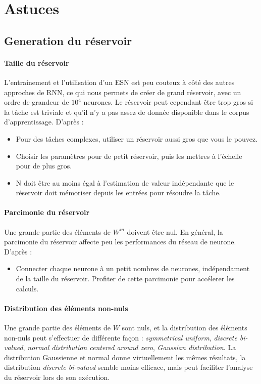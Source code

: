 \documentclass[12pt]{article}
\begin{document}
\section{Astuces}
\subsection{Generation du réservoir}
\paragraph{Taille du réservoir}
L'entrainement et l'utilisation d'un ESN est peu couteux à côté des autres approches de RNN, ce qui nous permets de créer de grand réservoir, avec un ordre de grandeur de $10^{4}$ neurones. Le réservoir peut cependant être trop gros si la tâche est triviale et qu'il n'y a pas assez de donnée disponible dans le corpus d'apprentissage.\newline
D'après \cite{Lukosevicius12}:
\begin{itemize}
\item Pour des tâches complexes, utiliser un réservoir aussi gros que vous le pouvez.
\item Choisir les paramètres pour de petit réservoir, puis les mettres à l'échelle pour de plus gros.
\item N doit être au moins égal à l'estimation de valeur indépendante que le réservoir doit mémoriser depuis les entrées pour résoudre la tâche.
\end{itemize}

\paragraph{Parcimonie du réservoir}
Une grande partie des éléments de $W^{in}$ doivent être nul. En général, la parcimonie du réservoir affecte peu les performances du réseau de neurone.\newline
D'après \cite{Lukosevicius12}:
\begin{itemize}
\item Connecter chaque neurone à un petit nombres de neurones, indépendament de la taille du réservoir. Profiter de cette parcimonie pour accélerer les calculs.
\end{itemize}

\paragraph{Distribution des éléments non-nuls}
Une grande partie des éléments de $W$ sont nuls, et la distribution des éléments non-nuls peut s'effectuer de différente façon : \textit{symmetrical uniform}, \textit{discrete bi-valued}, \textit{normal distribution centered around zero}, \textit{Gaussian distribution}.\newline
La distribution Gaussienne et normal donne virtuellement les mêmes résultats, la distribution \textit{discrete bi-valued} semble moins efficace, mais peut faciliter l'analyse du réservoir lors de son exécution.
\end{document}
